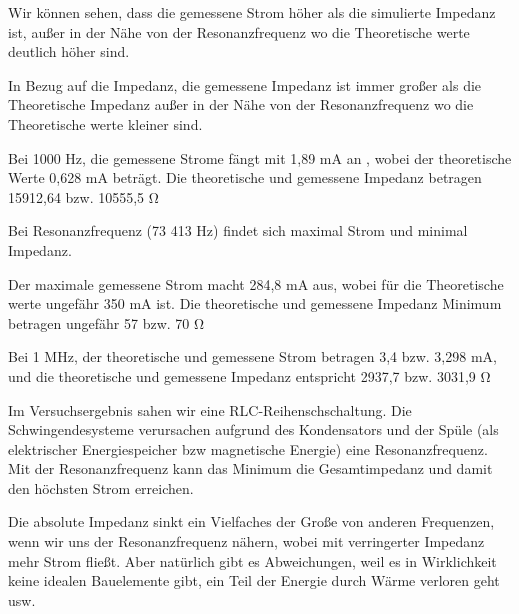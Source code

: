 %
%
Wir können sehen, dass die gemessene Strom höher als die simulierte Impedanz ist, außer in der Nähe von der Resonanzfrequenz wo die Theoretische werte deutlich höher sind.

In Bezug auf die Impedanz, die gemessene Impedanz ist immer großer als die Theoretische Impedanz außer in der Nähe von der Resonanzfrequenz wo die Theoretische werte kleiner sind.

Bei 1000 Hz, die gemessene Strome fängt mit 1,89 mA an , wobei der theoretische Werte 0,628 mA beträgt. Die theoretische und gemessene Impedanz betragen 15912,64 bzw. 10555,5 Ω  

Bei Resonanzfrequenz (73 413 Hz) findet sich maximal Strom und minimal Impedanz.

Der maximale gemessene Strom macht 284,8 mA aus, wobei für die Theoretische werte ungefähr 350 mA ist. Die theoretische und gemessene Impedanz Minimum betragen ungefähr 57 bzw.  70 Ω  

Bei 1 MHz, der theoretische und gemessene Strom betragen 3,4 bzw. 3,298 mA, und die theoretische und gemessene Impedanz entspricht 2937,7 bzw. 3031,9 Ω

Im Versuchsergebnis sahen wir eine RLC-Reihenschschaltung. Die Schwingendesysteme verursachen aufgrund des Kondensators und der Spüle (als elektrischer Energiespeicher bzw magnetische Energie) eine Resonanzfrequenz. Mit der Resonanzfrequenz kann das Minimum die Gesamtimpedanz und damit den höchsten Strom erreichen.

Die absolute Impedanz sinkt ein Vielfaches der Große von anderen Frequenzen, wenn wir uns der Resonanzfrequenz nähern, wobei mit verringerter Impedanz mehr Strom fließt. Aber natürlich gibt es Abweichungen, weil es in Wirklichkeit keine idealen Bauelemente gibt, ein Teil der Energie durch Wärme verloren geht usw.
%
%
%
%
%
%
%